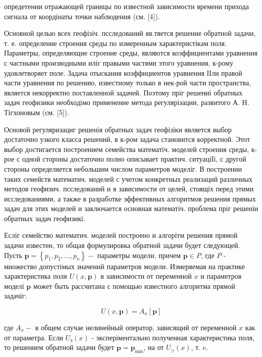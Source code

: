 \documentclass[10pt]{article}
\begin{document}
опредетении отражающей границы по известной зависимости времени прихода сигнала от коордінаты точки наблюдения (см. [4]).



Основной целью всех геофізіч. псследований яв.тяется решение обратной задачи, т. е. определение строения среды по измеренным характеристікам поля. Параметры, определяющие строение среды, являются коэффициентами уравнения с частными производными иліг правыми частями этого уравнения, к-рому удовлетворяет поле. Задача отыскания коэффициентов уравнения ІІли правой части уравнения по решению, известному только в нек-рой части пространства, является некорректно поставленной задачей. Поэтому пріг решениі обратных задач геофизики необходімо применение метода регулярізации, развитого А. Н. Тігхоновым (см. [5]).



Основой регуляризациг решенія обратных задач геофізіки является выбор достаточно узкого класса решений, в к-ром задача становится корректной. Этот выбор достигается построением семейства математіч. моделей строения среды, к-рое с одной стороны достаточно полно описывает практич. ситуаціІі, с другой стороны определяется небольшим числом параметров моделіг. В построении таких семейств математич. моделей с учетом конкретных реализаций различных методов геофизич. псследований и в зависимости от целей, стоящіх перед этими исследованиями, а также в разработке эффективных алгоритмов решения прямых задач для этих моделей и заключается основная математіч. проблема пріг решеніи обратных задач геофизикі.



Есліг семейство математич. моделей построено и алгорітм решения прямой задачи известен, то общая формулировка обратной задачи будет следующей. Пусть $\boldsymbol{p}=\left\{p_{1}, p_{2}, \ldots, p_{n}\right\}-$ параметры модели, причем $\boldsymbol{p} \in P$, где $P$ - множество допустімых значений параметров модели. Измеряемая на практике характеристика поля $U(x, \boldsymbol{p})$ в зависимости от переменной $x$ и параметров моделі $\boldsymbol{p}$ может быть рассчитана с помощью известного алгоритма прямой задачіг:



\[

U(x, \boldsymbol{p})=A_{x}[\boldsymbol{p}]

\]



где $A_{x}-$ в общем случае нелинейный оператор, зависящий от переменной $x$ как от параметра. Если $U_{э}(x)$ - эксперіментально полученная характеристика поля, то решением обратной задачи будет $\boldsymbol{p}=\boldsymbol{p}_{\mathrm{min}}$, на от $U_{\ni}(x)$, т. $\mathrm{e}$.
\end{document}
